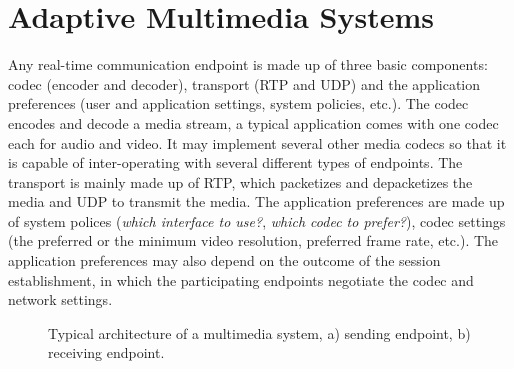 \section{Adaptive Multimedia Systems}
\label{fw.amusys}

Any real-time communication endpoint is made up of three basic components:
codec (encoder and decoder), transport (RTP and UDP) and the application
preferences (user and application settings, system policies, etc.). The codec
encodes and decode a media stream, a typical application comes with one codec
each for audio and video. It may implement several other media codecs so that
it is capable of inter-operating with several different types of endpoints.
The transport is mainly made up of RTP, which packetizes and depacketizes the
media and UDP to transmit the media. The application preferences are made up
of system polices (\emph{which interface to use?}, \emph{which codec to
prefer?}), codec settings (the preferred or the minimum video resolution,
preferred frame rate, etc.). The application preferences may also depend on
the outcome of the session establishment, in which the participating endpoints
negotiate the codec and network settings.

\begin{figure}
  \centerline{
  }
  
  \caption{Typical architecture of a multimedia system, a) sending endpoint,
  b) receiving endpoint.}
  \label{fig:4:appint}
\end{figure}

